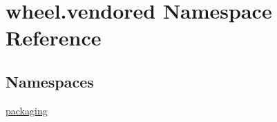\hypertarget{namespacewheel_1_1vendored}{}\section{wheel.\+vendored Namespace Reference}
\label{namespacewheel_1_1vendored}
\subsection*{Namespaces}
\begin{DoxyCompactItemize}
\item 
 \hyperlink{namespacewheel_1_1vendored_1_1packaging}{packaging}
\end{DoxyCompactItemize}
